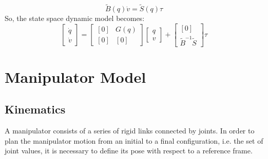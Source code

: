 \begin{equation}
\tilde{B}(q)\dot{v} = \tilde{S}(q)\tau
\end{equation}
So, the state space dynamic model becomes:
\begin{equation}
\left[ 
\begin{matrix}
\dot{q} \\ \dot{v}
\end{matrix}
\right] = \left[ 
\begin{matrix}
[0] & G(q)\\ [0] & [0]
\end{matrix}
\right]\left[ 
\begin{matrix}
q \\ v
\end{matrix}
\right] + \left[ 
\begin{matrix}
[0] \\ \tilde{B}^{-1}\tilde{S}
\end{matrix}
\right] \tau
\end{equation}

\section{Manipulator Model}
\subsection{Kinematics}
A manipulator consists of a series of rigid links connected by joints. In order to plan the manipulator motion from an initial to a final configuration, i.e. the set of joint values, it is necessary to define its pose with respect to a reference frame. 
